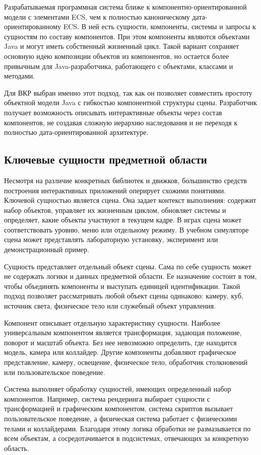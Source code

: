 Разрабатываемая программная система ближе к компонентно-ориентированной
модели с элементами ECS, чем к полностью каноническому
дата-ориентированному ECS. В ней есть сущности, компоненты, системы и
запросы к сущностям по составу компонентов. При этом компоненты являются
объектами Java и могут иметь собственный жизненный цикл. Такой вариант
сохраняет основную идею композиции объектов из компонентов, но остается
более привычным для Java-разработчика, работающего с объектами, классами
и методами.

Для ВКР выбран именно этот подход, так как он позволяет совместить
простоту объектной модели Java с гибкостью компонентной структуры сцены.
Разработчик получает возможность описывать интерактивные объекты через
состав компонентов, не создавая сложную иерархию наследования и не
переходя к полностью дата-ориентированной архитектуре.

\subsection{Ключевые сущности предметной области}

Несмотря на различие конкретных библиотек и движков, большинство
средств построения интерактивных приложений оперирует схожими
понятиями. Ключевой сущностью является сцена. Она задает контекст
выполнения: содержит набор объектов, управляет их жизненным циклом,
обновляет системы и определяет, какие объекты участвуют в текущем кадре.
В играх сцена может соответствовать уровню, меню или отдельному режиму.
В учебном симуляторе сцена может представлять лабораторную установку,
эксперимент или демонстрационный пример.

Сущность представляет отдельный объект сцены. Сама по себе сущность
может не содержать логики и данных предметной области. Ее назначение
состоит в том, чтобы объединять компоненты и выступать единицей
идентификации. Такой подход позволяет рассматривать любой объект сцены
одинаково: камеру, куб, источник света, физическое тело или служебный
объект управления.

Компонент описывает отдельную характеристику сущности. Наиболее
универсальным компонентом является трансформация, задающая положение,
поворот и масштаб объекта. Без нее невозможно определить, где находится
модель, камера или коллайдер. Другие компоненты добавляют графическое
представление, камеру, освещение, физическое тело, обработчик столкновений
или пользовательское поведение.

Система выполняет обработку сущностей, имеющих определенный набор
компонентов. Например, система рендеринга выбирает сущности с
трансформацией и графическим компонентом, система скриптов вызывает
пользовательское поведение, а физическая система работает с физическими
телами и коллайдерами. Благодаря этому логика обработки не размазывается
по всем объектам, а сосредотачивается в подсистемах, отвечающих за
конкретную область.

